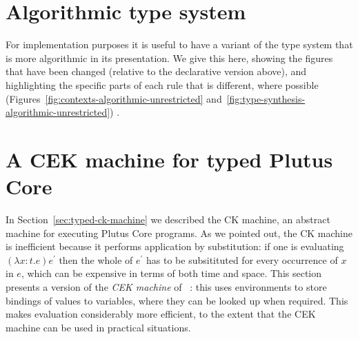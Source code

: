 \documentclass[a4paper]{article}
\begin{document}
\begin{appendices}
\section{Algorithmic type system}

For implementation purposes it is useful to have a variant of the type
system that is more algorithmic in its presentation. We give this
here, showing the figures that have been changed (relative to the
declarative version above), and highlighting the specific parts of
each rule that is different, where possible
(Figures~\ref{fig:contexts-algorithmic-unrestricted}
and~\ref{fig:type-synthesis-algorithmic-unrestricted}) .




\section{A CEK machine for typed Plutus Core}
\label{appendix:typed-cek-machine}
In Section~\ref{sec:typed-ck-machine} we described the CK machine, an
abstract machine for executing Plutus Core programs.  As we pointed
out, the CK machine is inefficient because it performs application by
substitution: if one is evaluating $(\lambda x:t.e)e^{\prime}$ then
the whole of $e^{\prime}$ has to be subsitituted for every occurrence
of $x$ in $e$, which can be expensive in terms of both time and space.
This section presents a version of the \textit{CEK machine} of
~\citep{Felleisen-CK-CEK}: this uses environments to store bindings of
values to variables, where they can be looked up when required. This
makes evaluation considerably more efficient, to the extent that the
CEK machine can be used in practical situations.


\end{appendices}
\end{document}
